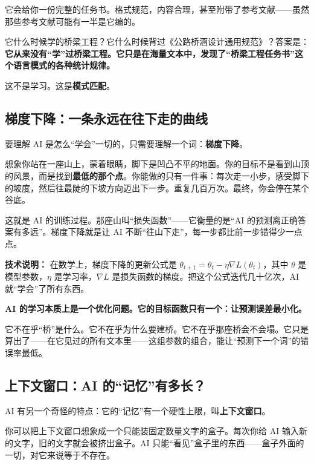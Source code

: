 它会给你一份完整的任务书。格式规范，内容合理，甚至附带了参考文献——虽然那些参考文献可能有一半是它编的。

它什么时候学的桥梁工程？它什么时候背过《公路桥涵设计通用规范》？答案是：\textbf{它从来没有“学”过桥梁工程。它只是在海量文本中，发现了“桥梁工程任务书”这个语言模式的各种统计规律。}

这不是学习。这是\textbf{模式匹配}。

\subsection{梯度下降：一条永远在往下走的曲线}

要理解 AI 是怎么“学会”一切的，只需要理解一个词：\textbf{梯度下降}。

想象你站在一座山上，蒙着眼睛，脚下是凹凸不平的地面。你的目标不是看到山顶的风景，而是找到\textbf{最低的那个点}。你能做的只有一件事：每次走一小步，感受脚下的坡度，然后往最陡的下坡方向迈出下一步。重复几百万次。最终，你会停在某个谷底。

这就是 AI 的训练过程。那座山叫“损失函数”——它衡量的是“AI 的预测离正确答案有多远”。梯度下降就是让 AI 不断“往山下走”，每一步都比前一步错得少一点点。

\vspace{0.3cm}

{\small\color{muted} \textbf{技术说明：} 在数学上，梯度下降的更新公式是 $\theta_{t+1} = \theta_t - \eta \nabla L(\theta_t)$，其中 $\theta$ 是模型参数，$\eta$ 是学习率，$\nabla L$ 是损失函数的梯度。把这个公式迭代几十亿次，AI 就“学会”了所有东西。}

\vspace{0.3cm}

\begin{insight}
\label{insight:chap1-1}

\textbf{AI 的学习本质上是一个优化问题。它的目标函数只有一个：让预测误差最小化。}

它不在乎“桥”是什么。它不在乎为什么要建桥。它不在乎那座桥会不会塌。它只是算出了——在它见过的所有文本里——这组参数的组合，能让“预测下一个词”的错误率最低。
\end{insight}

\subsection{上下文窗口：AI 的“记忆”有多长？}

AI 有另一个奇怪的特点：它的“记忆”有一个硬性上限，叫\textbf{上下文窗口}。

你可以把上下文窗口想象成一个只能装固定数量文字的盒子。每次你给 AI 输入新的文字，旧的文字就会被挤出盒子。AI 只能“看见”盒子里的东西——盒子外面的一切，对它来说等于不存在。

